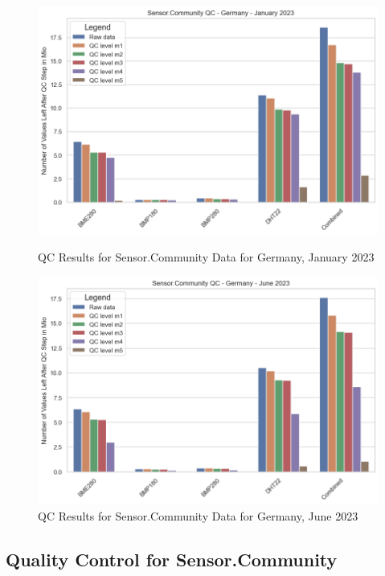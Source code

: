 \begin{figure}[htp]
    \centering
    \includegraphics[width=1\textwidth]{images/sensor_community_qc_january_23.png}
    \caption{QC Results for Sensor.Community Data for Germany, January 2023}
    \label{fig:qc sensor community jan 23}

    \centering
    \includegraphics[width=1\textwidth]{images/sensor_community_qc_june_23.png}
    \caption{QC Results for Sensor.Community Data for Germany, June 2023}
    \label{fig:qc sensor community june 23}
\end{figure}

\subsection{Quality Control for Sensor.Community}

